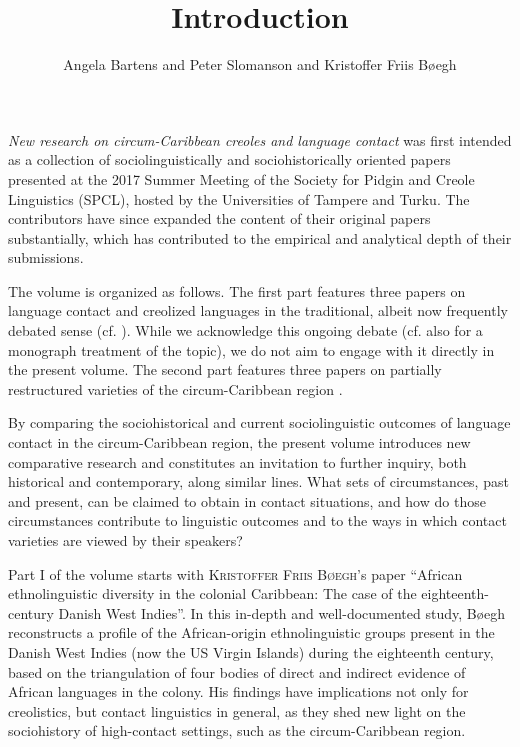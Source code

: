 \documentclass[output=paper,colorlinks,citecolor=brown]{langscibook}
\title{Introduction}
\author{Angela Bartens\orcid{}\affiliation{University of Turku;University of Helsinki} and Peter Slomanson\orcid{}\affiliation{Tampere University;University of Turku} and Kristoffer Friis Bøegh\orcid{}\affiliation{Utrecht University;Aarhus University}}
\begin{document}
\maketitle

\noindent\emph{New research on circum-Caribbean creoles and language contact} was first intended as a collection of sociolinguistically and sociohistorically oriented papers presented at the 2017 Summer Meeting of the Society for Pidgin and Creole Linguistics (SPCL), hosted by the Universities of Tampere and Turku. The contributors have since expanded the content of their original papers substantially, which has contributed to the empirical and analytical depth of their submissions.

The volume is organized as follows. The first part features three papers on language contact and creolized languages in the traditional, albeit now frequently debated sense (cf. \cite{Holm_1989,McWhorter_1998,DeGraff2020}). While we acknowledge this ongoing debate (cf. also \cite{McWhorter_2018} for a monograph treatment of the topic), we do not aim to engage with it directly in the present volume. The second part features three papers on partially restructured varieties \citep[cf.][]{Holm_2004} of the circum-Caribbean region \citep{Fleischmann_1986}.

By comparing the sociohistorical and current sociolinguistic outcomes of language contact in the circum-Caribbean region, the present volume introduces new comparative research and constitutes an invitation to further inquiry, both historical and contemporary, along similar lines. What sets of circumstances, past and present, can be claimed to obtain in contact situations, and how do those circumstances contribute to linguistic outcomes and to the ways in which contact varieties are viewed by their speakers?

Part I of the volume starts with \textsc{Kristoffer Friis Bøegh}'s paper “African ethnolinguistic diversity in the colonial Caribbean: The case of the eighteenth-century Danish West Indies”. In this in-depth and well-documented study, Bøegh reconstructs a profile of the African-origin ethnolinguistic groups present in the Danish West Indies (now the US Virgin Islands) during the eighteenth century, based on the triangulation of four bodies of direct and indirect evidence of African languages in the colony. His findings have implications not only for creolistics, but contact linguistics in general, as they shed new light on the sociohistory of high-contact settings, such as the circum-Caribbean region.
\end{document}
